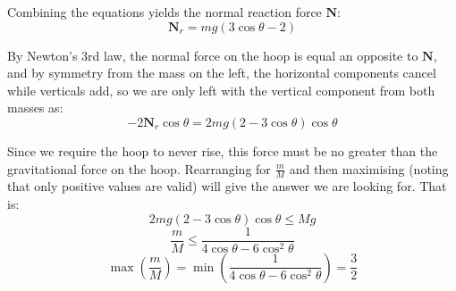 \documentclass[a4paper]{scrartcl}
\begin{document}
Combining the equations yields the normal reaction force \(\mathbf{N}\):
\[\mathbf{N}_r = m g (3 \cos \theta - 2)\]

By Newton's 3rd law, the normal force on the hoop is equal an opposite to \(\mathbf{N}\), and by symmetry from the mass on the left, the horizontal components cancel while verticals add, so we are only left with the vertical component from both masses as:
\[-2 \mathbf{N}_r \cos \theta = 2 m g (2 - 3 \cos \theta) \cos \theta\]

Since we require the hoop to never rise, this force must be no greater than the gravitational force on the hoop. Rearranging for \(\frac{m}{M}\) and then maximising (noting that only positive values are valid) will give the answer we are looking for. That is:
\[2 m g (2 - 3 \cos \theta) \cos \theta \leq M g\]
\[\frac{m}{M} \leq \frac{1}{4 \cos \theta - 6 \cos^2 \theta}\]
\[\max\left(\frac{m}{M}\right) = \min\left(\frac{1}{4 \cos \theta - 6 \cos^2 \theta}\right) = \frac{3}{2}\]
\end{document}
